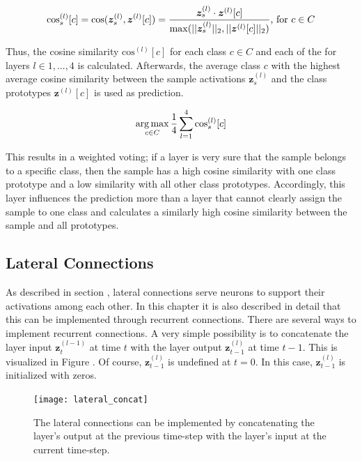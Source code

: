 \begin{equation}\eqlbl{vso_11}
		\text{cos}^{(l)}_s[c] = \text{cos}(\boldsymbol{z}^{(l)}_s, \boldsymbol{z}^{(l)}[c]) = \frac{\boldsymbol{z}^{(l)}_s \cdot \boldsymbol{z}^{(l)}[c]}{\max(||\boldsymbol{z}^{(l)}_s||_2, ||\boldsymbol{z}^{(l)}[c]||_2)} \text{, for } c \in C
\end{equation}

Thus, the cosine similarity $\text{cos}^{(l)}[c]$ for each class $c \in C$ and each of the for layers $l \in {1, ..., 4}$ is calculated. Afterwards, the average class $c$ with the highest average cosine similarity between the sample activations $\boldsymbol{z}^{(l)}_s$ and the class prototypes $\boldsymbol{z}^{(l)}[c]$ is used as prediction.

\begin{equation}\eqlbl{vso_12}
		\argmax_{c \in C} \frac{1}{4} \sum_{l=1}^{4} \text{cos}^{(l)}_s[c]
\end{equation}

This results in a weighted voting; if a layer is very sure that the sample belongs to a specific class, then the sample has a high cosine similarity with one class prototype and a low similarity with all other class prototypes. Accordingly, this layer influences the prediction more than a layer that cannot clearly assign the sample to one class and calculates a similarly high cosine similarity between the sample and all prototypes.


\subsection{Lateral Connections}
As described in section , lateral connections serve neurons to support their activations among each other.
In this chapter it is also described in detail that this can be implemented through recurrent connections.
There are several ways to implement recurrent connections. A very simple possibility is to concatenate the layer input $\boldsymbol{z}^{(l-1)}_t$ at time $t$ with the layer output $\boldsymbol{z}^{(l)}_{t-1}$  at time $t-1$. This is visualized in Figure . Of course, $\boldsymbol{z}^{(l)}_{t-1}$ is undefined at $t=0$. In this case, $\boldsymbol{z}^{(l)}_{t-1}$ is initialized with zeros.

\begin{figure}[h]
    \centering
    \texttt{[image: lateral\_concat]}
    \caption[Lateral connections by concatenating the layer's output with the layer's input]{The lateral connections can be implemented by concatenating the layer's output at the previous time-step with the layer's input at the current time-step.}
\end{figure}


